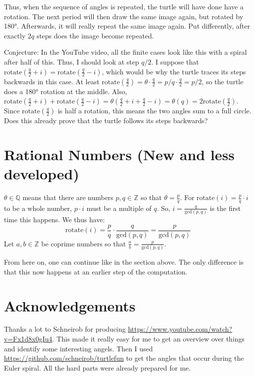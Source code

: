\documentclass[pdftex,a4paper]{scrartcl}
\newcommand{\rotate}{\text{rotate}}
\begin{document}
Thus, when the sequence of angles is repeated, the turtle will have done have a rotation. The next period will then draw
the same image again, but rotated by 180°. Afterwards, it will really repeat the same image again. Put differently,
after exactly \(2q\) steps does the image become repeated.

Conjecture: In the YouTube video, all the finite cases look like this with a spiral after half of this. Thus, I should
look at step \(q/2\). I suppose that \(\rotate(\frac{q}{2} + i)=\rotate(\frac{q}{2} -i)\), which would be why the turtle
traces its steps backwards in this case. At least \(\rotate(\frac{q}{2})=\theta\cdot \frac{q}{2} = p/q \cdot \frac{q}{2}
= p/2\), so the turtle does a 180° rotation at the middle. Also, \(\rotate(\frac{q}{2} + i)+\rotate(\frac{q}{2}-i) =
\theta(\frac{q}{2}+i + \frac{q}{2}-i) = \theta(q) = 2\rotate(\frac{q}{2})\).  Since \(\rotate(\frac{q}{2})\) is half a
rotation, this means the two angles sum to a full circle. Does this already prove that the turtle follows its steps
backwards?

\section{Rational Numbers (New and less developed)}
\(\theta\in\mathbb{Q}\) means that there are numbers \(p,q\in\mathbb{Z}\) so that \(\theta=\frac{p}{q}\).
For \(\rotate(i)=\frac{p}{q}\cdot i\) to be a whole number, \(p\cdot i\) must be a multiple of \(q\). So,
\(i=\frac{q}{\text{gcd}(p,q)}\) is the first time this happens. We thus have:
\[
\rotate(i)=\frac{p}{q}\cdot\frac{q}{\text{gcd}(p,q)}=\frac{p}{\text{gcd}(p,q)}
\]
Let \(a,b\in\mathbb{Z}\) be coprime numbers so that \(\frac{a}{b}=\frac{p}{\text{gcd}(p,q)}\).

From here on, one can continue like in the section above. The only difference is that this now happens at an earlier step
of the computation.

\section{Acknowledgements}
Thanks a lot to Schneirob for producing \url{https://www.youtube.com/watch?v=Fx1d8x0gIu4}. This made it really easy for
me to get an overview over things and identify some interesting angels. Then I used
\url{https://github.com/schneirob/turtlefun} to get the angles that occur during the Euler spiral. All the hard parts
were already prepared for me.
\end{document}
